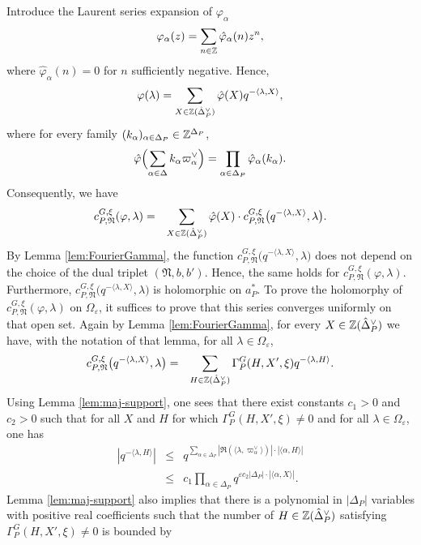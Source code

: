\begin{paragr}
\begin{preuve}
Introduce the Laurent series expansion of $\varphi_\alpha$
$$\varphi_\alpha(z)=\sum_{n\in \mathbb{Z}} \hat{\varphi}_\alpha(n) z^n,$$
where $\hat{\varphi}_\alpha(n)=0$ for $n$ sufficiently negative. Hence,
$$\varphi(\lambda)=\sum_{X\in \mathbb{Z}(\hat{\Delta}_P^\vee)} \hat{\varphi}(X) q^{-\langle \lambda,X\rangle},$$
where for every family $(k_\alpha)_{\alpha\in \Delta_P}\in \mathbb{Z}^{\Delta_P}$,
$$\hat{\varphi}\Bigl(\sum_{\alpha\in \Delta} k_\alpha \varpi_\alpha^\vee\Bigr) =\prod_{\alpha \in \Delta_P}\hat{\varphi}_\alpha(k_\alpha).$$
Consequently, we have
\begin{eqnarray*}
  c_{P,\mathfrak{N}}^{G,\xi}(\varphi,\lambda)&=&\sum_{X\in \mathbb{Z}(\hat{\Delta}_P^\vee)} \hat{\varphi}(X) \cdot c_{P,\mathfrak{N}}^{G,\xi}\bigl( q^{-\langle \lambda,X\rangle},\lambda\bigr).
\end{eqnarray*}
By Lemma \ref{lem:FourierGamma}, the function $c_{P,\mathfrak{N}}^{G,\xi}\bigl( q^{-\langle \lambda,X\rangle},\lambda\bigr)$ does not depend on the choice of the dual triplet $(\mathfrak{N},b,b')$. Hence, the same holds for $c_{P,\mathfrak{N}}^{G,\xi}(\varphi,\lambda)$. Furthermore, $c_{P,\mathfrak{N}}^{G,\xi}\bigl( q^{-\langle \lambda,X\rangle},\lambda\bigr)$ is holomorphic on $a_P^*$. To prove the holomorphy of $c_{P,\mathfrak{N}}^{G,\xi}(\varphi,\lambda)$ on $\Omega_\varepsilon$, it suffices to prove that this series converges uniformly on that open set. Again by Lemma \ref{lem:FourierGamma}, for every $X\in \mathbb{Z}(\hat{\Delta}_P^\vee)$ we have, with the notation of that lemma, for all $\lambda\in \Omega_\varepsilon$,
\begin{eqnarray*}
c_{P,\mathfrak{N}}^{G,\xi}\bigl( q^{-\langle \lambda,X\rangle},\lambda\bigr)&=&\sum_{H\in \mathbb{Z}(\hat{\Delta}_P^\vee)} \Gamma_P^G(H,X',\xi) q^{-\langle \lambda , H\rangle }.
\end{eqnarray*}
Using Lemma \ref{lem:maj-support}, one sees that there exist constants $c_1>0$ and $c_2>0$ such that for all $X$ and $H$ for which $\Gamma_P^G(H,X',\xi)\neq 0$ and for all $\lambda\in \Omega_\varepsilon$, one has 
\begin{eqnarray*}
   |q^{-\langle \lambda , H\rangle }|&\leq&  q^{\sum_{\alpha\in \Delta_P}  |\Re(\langle \lambda,\varpi_\alpha^\vee \rangle)| \cdot|\langle \alpha ,H  \rangle| }\\
&\leq &c_1 \prod_{\alpha\in \Delta_P} q^{ \varepsilon c_2 |\Delta_P|\cdot |\langle \alpha ,X  \rangle|   }.
\end{eqnarray*}
Lemma \ref{lem:maj-support} also implies that there is a polynomial in $|\Delta_P|$ variables with positive real coefficients such that the number of $H\in \mathbb{Z}(\hat{\Delta}_P^\vee)$ satisfying $\Gamma_P^G(H,X',\xi)\neq 0$ is bounded by 

\end{preuve}
\end{paragr}
